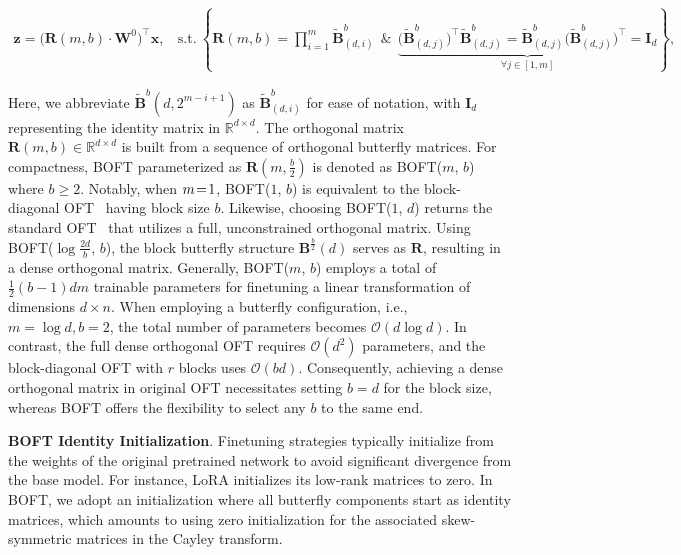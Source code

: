 \begin{equation}
    \begin{aligned}\nonumber
    \bm{z}=\big(\bm{R}(m,b)\cdot\bm{W}^0\big)^\top\bm{x},~~~~\text{s.t.}~\left\{\bm{R}(m,b)=\prod_{i=1}^m \tilde{\bm{B}}^b_{(d,i)}~~\&~~\underbrace{\big(\tilde{\bm{B}}^b_{(d,j)}\big)^\top\tilde{\bm{B}}^b_{(d,j)}=\tilde{\bm{B}}^b_{(d,j)}\big(\tilde{\bm{B}}^b_{(d,j)}\big)^\top\!=\bm{I}_d}_{\forall j\in [1, m]}\right\},
    \end{aligned}
\end{equation}

Here, we abbreviate $\tilde{\bm{B}}^b(d,2^{m-i+1})$ as $\tilde{\bm{B}}^b_{(d,i)}$ for ease of notation, with $\bm{I}_d$ representing the identity matrix in $\mathbb{R}^{d\times d}$. The orthogonal matrix $\bm{R}(m,b)\in\mathbb{R}^{d\times d}$ is built from a sequence of orthogonal butterfly matrices. For compactness, BOFT parameterized as $\bm{R}(m, \frac{b}{2})$ is denoted as BOFT($m$, $b$) where $b\geq 2$. Notably, when $\thickmuskip=2mu \medmuskip=2mu m=1$, BOFT($1$, $b$) is equivalent to the block-diagonal OFT~\cite{qiu2023controlling} having block size $b$. Likewise, choosing BOFT($1$, $d$) returns the standard OFT~\cite{qiu2023controlling} that utilizes a full, unconstrained orthogonal matrix. Using BOFT($\log \frac{2d}{b}$, $b$), the block butterfly structure $\bm{B}^{\frac{b}{2}}(d)$ serves as $\bm{R}$, resulting in a dense orthogonal matrix. Generally, BOFT($m$, $b$) employs a total of $\frac{1}{2}(b-1)dm$ trainable parameters for finetuning a linear transformation of dimensions $d\times n$. When employing a butterfly configuration, i.e., $m=\log d, b=2$, the total number of parameters becomes $\mathcal{O}(d\log d)$. In contrast, the full dense orthogonal OFT requires $\mathcal{O}(d^2)$ parameters, and the block-diagonal OFT with $r$ blocks uses $\mathcal{O}(bd)$. Consequently, achieving a dense orthogonal matrix in original OFT necessitates setting $b=d$ for the block size, whereas BOFT offers the flexibility to select any $b$ to the same end.

\textbf{BOFT Identity Initialization}. Finetuning strategies typically initialize from the weights of the original pretrained network to avoid significant divergence from the base model. For instance, LoRA initializes its low-rank matrices to zero. In BOFT, we adopt an initialization where all butterfly components start as identity matrices, which amounts to using zero initialization for the associated skew-symmetric matrices in the Cayley transform.

